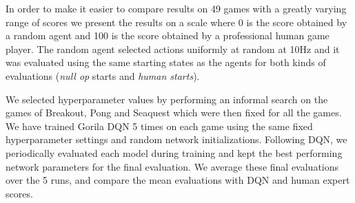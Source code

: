 In order to make it easier to compare results on 49 games with a greatly varying range of scores we present the results on a scale where 0 is the score obtained by a random agent and 100 is the score obtained by a professional human game player.
The random agent selected actions uniformly at random at 10Hz and it was evaluated using the same starting states as the agents for both kinds of evaluations ({\it null op} starts and {\it human starts}).

We selected hyperparameter values by performing an informal search on the games of Breakout, Pong and Seaquest which were then fixed for all the games.
We have trained Gorila DQN 5 times on each game using the same fixed hyperparameter settings and random network initializations. Following DQN, we periodically evaluated each model during training and kept the best performing network parameters for the final evaluation. We average these final evaluations over the 5 runs, and compare the mean evaluations with DQN and human expert scores.


